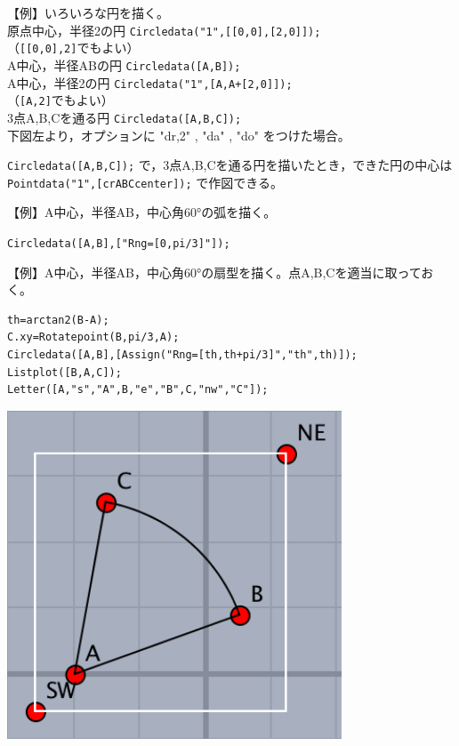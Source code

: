 \documentclass[papersize,a4paper,12pt,uplatex]{jsarticle}
\begin{document}
\begin{description}
\begin{tabbing}
【例】いろいろな円を描く。\\
 \>原点中心，半径2の円\> \verb|Circledata("1",[[0,0],[2,0]]);|\\
  \hspace{50mm}（\verb|[[0,0],2]|でもよい）\\
 \>A中心，半径ABの円\> \verb|Circledata([A,B]);|\\
 \>A中心，半径2の円\> \verb|Circledata("1",[A,A+[2,0]]);|\\
  \hspace{50mm}（\verb|[A,2]|でもよい）\\
 \>3点A,B,Cを通る円\> \verb|Circledata([A,B,C]);|\\
 \>下図左より，オプションに "dr,2" , "da" , "do" をつけた場合。
\end{tabbing}
\hspace{10mm} 
\vspace{\baselineskip}


 \verb|Circledata([A,B,C]);| で，3点A,B,Cを通る円を描いたとき，できた円の中心は \verb|Pointdata("1",[crABCcenter]);| で作図できる。
 
\vspace{\baselineskip}
【例】A中心，半径AB，中心角60°の弧を描く。

\hspace{10mm}\verb|Circledata([A,B],["Rng=[0,pi/3]"]); |

\vspace{\baselineskip}
【例】A中心，半径AB，中心角60°の扇型を描く。点A,B,Cを適当に取っておく。

\begin{verbatim}
th=arctan2(B-A);
C.xy=Rotatepoint(B,pi/3,A);
Circledata([A,B],[Assign("Rng=[th,th+pi/3]","th",th)]);
Listplot([B,A,C]); 
Letter([A,"s","A",B,"e","B",C,"nw","C"]);
\end{verbatim}

\begin{center}
\includegraphics[bb=0.00 0.00 180.01 177.01,width=4cm"] {Fig/circledata3.pdf}\hspace{12mm}
\end{center}


\end{description}
\end{document}
